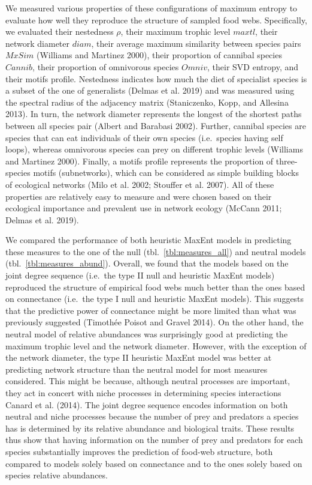 \documentclass[11pt]{article}
\begin{document}
We measured various properties of these configurations of maximum
entropy to evaluate how well they reproduce the structure of sampled
food webs. Specifically, we evaluated their nestedness \(\rho\), their
maximum trophic level \(maxtl\), their network diameter \(diam\), their
average maximum similarity between species pairs \(MxSim\) (Williams and
Martinez 2000), their proportion of cannibal species \(Cannib\), their
proportion of omnivorous species \(Omniv\), their SVD entropy, and their
motifs profile. Nestedness indicates how much the diet of specialist
species is a subset of the one of generalists (Delmas et al. 2019) and
was measured using the spectral radius of the adjacency matrix
(Staniczenko, Kopp, and Allesina 2013). In turn, the network diameter
represents the longest of the shortest paths between all species pair
(Albert and Barabasi 2002). Further, cannibal species are species that
can eat individuals of their own species (i.e.~species having self
loops), whereas omnivorous species can prey on different trophic levels
(Williams and Martinez 2000). Finally, a motifs profile represents the
proportion of three-species motifs (subnetworks), which can be
considered as simple building blocks of ecological networks (Milo et al.
2002; Stouffer et al. 2007). All of these properties are relatively easy
to measure and were chosen based on their ecological importance and
prevalent use in network ecology (McCann 2011; Delmas et al. 2019).

We compared the performance of both heuristic MaxEnt models in
predicting these measures to the one of the null
(tbl.~\ref{tbl:measures_all}) and neutral models
(tbl.~\ref{tbl:measures_abund}). Overall, we found that the models based
on the joint degree sequence (i.e.~the type II null and heuristic MaxEnt
models) reproduced the structure of empirical food webs much better than
the ones based on connectance (i.e.~the type I null and heuristic MaxEnt
models). This suggests that the predictive power of connectance might be
more limited than what was previously suggested (Timothée Poisot and
Gravel 2014). On the other hand, the neutral model of relative
abundances was surprisingly good at predicting the maximum trophic level
and the network diameter. However, with the exception of the network
diameter, the type II heuristic MaxEnt model was better at predicting
network structure than the neutral model for most measures considered.
This might be because, although neutral processes are important, they
act in concert with niche processes in determining species interactions
Canard et al. (2014). The joint degree sequence encodes information on
both neutral and niche processes because the number of prey and
predators a species has is determined by its relative abundance and
biological traits. These results thus show that having information on
the number of prey and predators for each species substantially improves
the prediction of food-web structure, both compared to models solely
based on connectance and to the ones solely based on species relative
abundances.
\end{document}
